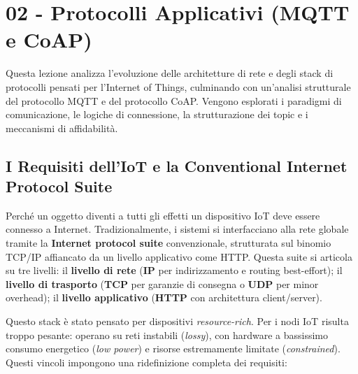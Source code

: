 \documentclass[
  italian,
  openany]{book}
\begin{document}
\newpage

\chapter{02 - Protocolli Applicativi (MQTT e
CoAP)}\label{protocolli-applicativi-mqtt-e-coap}

Questa lezione analizza l'evoluzione delle architetture di rete e degli
stack di protocolli pensati per l'Internet of Things, culminando con
un'analisi strutturale del protocollo MQTT e del protocollo CoAP.
Vengono esplorati i paradigmi di comunicazione, le logiche di
connessione, la strutturazione dei topic e i meccanismi di affidabilità.

\section{I Requisiti dell'IoT e la Conventional Internet Protocol
Suite}\label{i-requisiti-delliot-e-la-conventional-internet-protocol-suite}

Perché un oggetto diventi a tutti gli effetti un dispositivo IoT deve
essere connesso a Internet. Tradizionalmente, i sistemi si interfacciano
alla rete globale tramite la \textbf{Internet protocol suite}
convenzionale, strutturata sul binomio TCP/IP affiancato da un livello
applicativo come HTTP. Questa suite si articola su tre livelli: il
\textbf{livello di rete} (\textbf{IP} per indirizzamento e routing
best-effort); il \textbf{livello di trasporto} (\textbf{TCP} per
garanzie di consegna o \textbf{UDP} per minor overhead); il
\textbf{livello applicativo} (\textbf{HTTP} con architettura
client/server).

Questo stack è stato pensato per dispositivi \emph{resource-rich}. Per i
nodi IoT risulta troppo pesante: operano su reti instabili
(\emph{lossy}), con hardware a bassissimo consumo energetico (\emph{low
power}) e risorse estremamente limitate (\emph{constrained}). Questi
vincoli impongono una ridefinizione completa dei requisiti:
\end{document}

